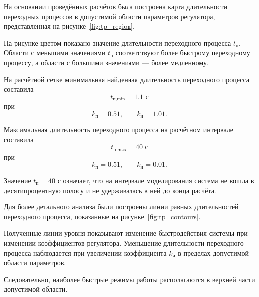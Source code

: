 На основании проведённых расчётов была построена карта длительности переходных процессов в допустимой области параметров регулятора, представленная на рисунке~\ref{fig:tp_region}.


На рисунке цветом показано значение длительности переходного процесса \(t_{\text{п}}\). Области с меньшими значениями \(t_{\text{п}}\) соответствуют более быстрому переходному процессу, а области с большими значениями — более медленному.

На расчётной сетке минимальная найденная длительность переходного процесса составила
\begin{equation}
t_{\text{п,min}} = 1.1 \text{ с}
\end{equation}
при
\begin{equation}
k_{\text{п}} = 0.51,
\qquad
k_{\text{и}} = 1.01.
\end{equation}

Максимальная длительность переходного процесса на расчётном интервале составила
\begin{equation}
t_{\text{п,max}} = 40 \text{ с}
\end{equation}
при
\begin{equation}
k_{\text{п}} = 0.51,
\qquad
k_{\text{и}} = 0.01.
\end{equation}

Значение \(t_{\text{п}} = 40\) с означает, что на интервале моделирования система не вошла в десятипроцентную полосу и не удерживалась в ней до конца расчёта.

Для более детального анализа были построены линии равных длительностей переходного процесса, показанные на рисунке~\ref{fig:tp_contours}.


Полученные линии уровня показывают изменение быстродействия системы при изменении коэффициентов регулятора. Уменьшение длительности переходного процесса наблюдается при увеличении коэффициента \(k_{\text{и}}\) в пределах допустимой области параметров.

Следовательно, наиболее быстрые режимы работы располагаются в верхней части допустимой области.

